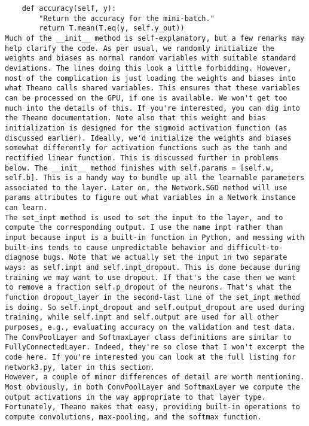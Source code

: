 \begin{lstlisting}
    def accuracy(self, y):
        "Return the accuracy for the mini-batch."
        return T.mean(T.eq(y, self.y_out))
Much of the __init__ method is self-explanatory, but a few remarks may help clarify the code. As per usual, we randomly initialize the weights and biases as normal random variables with suitable standard deviations. The lines doing this look a little forbidding. However, most of the complication is just loading the weights and biases into what Theano calls shared variables. This ensures that these variables can be processed on the GPU, if one is available. We won't get too much into the details of this. If you're interested, you can dig into the Theano documentation. Note also that this weight and bias initialization is designed for the sigmoid activation function (as discussed earlier). Ideally, we'd initialize the weights and biases somewhat differently for activation functions such as the tanh and rectified linear function. This is discussed further in problems below. The __init__ method finishes with self.params = [self.w, self.b]. This is a handy way to bundle up all the learnable parameters associated to the layer. Later on, the Network.SGD method will use params attributes to figure out what variables in a Network instance can learn.
The set_inpt method is used to set the input to the layer, and to compute the corresponding output. I use the name inpt rather than input because input is a built-in function in Python, and messing with built-ins tends to cause unpredictable behavior and difficult-to-diagnose bugs. Note that we actually set the input in two separate ways: as self.inpt and self.inpt_dropout. This is done because during training we may want to use dropout. If that's the case then we want to remove a fraction self.p_dropout of the neurons. That's what the function dropout_layer in the second-last line of the set_inpt method is doing. So self.inpt_dropout and self.output_dropout are used during training, while self.inpt and self.output are used for all other purposes, e.g., evaluating accuracy on the validation and test data.
The ConvPoolLayer and SoftmaxLayer class definitions are similar to FullyConnectedLayer. Indeed, they're so close that I won't excerpt the code here. If you're interested you can look at the full listing for network3.py, later in this section.
However, a couple of minor differences of detail are worth mentioning. Most obviously, in both ConvPoolLayer and SoftmaxLayer we compute the output activations in the way appropriate to that layer type. Fortunately, Theano makes that easy, providing built-in operations to compute convolutions, max-pooling, and the softmax function.

\end{lstlisting}
